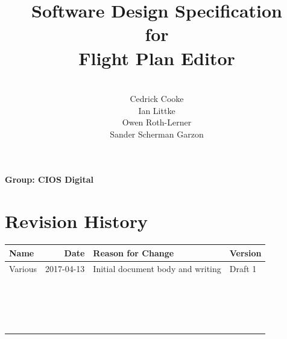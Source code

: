 \documentclass[12pt, letterpaper]{article}
\title{Software Design Specification\\for\\Flight Plan Editor}
\date{}
\author{
\\Cedrick Cooke\\
Ian Littke\\
Owen Roth-Lerner\\
Sander Scherman Garzon
}
\makeatletter
\renewcommand{\maketitle}{\bgroup\setlength{\parindent}{0pt}
\thispagestyle{empty}
\null
  \begin{flushleft}
  \vspace{15mm}
  \vskip2mm
  \Huge{\textbf{\@title}}
  \vspace{8cm}

  \textbf{Group: CIOS Digital}
  \@author
  \end{flushleft}\egroup
}
\makeatother
\begin{document}
\maketitle
\newpage
\section*{Revision History}
\begin{tabularx}{\textwidth}{|l|r|X|l|}
\hline
\textbf{Name} & \textbf{Date} & \textbf{Reason for Change} & \textbf{Version} \\ \hline
Various & 2017-04-13 & Initial document body and writing & Draft 1 \\ \hline
        &            &                                   &         \\ \hline
        &            &                                   &         \\ \hline
        &            &                                   &         \\ \hline
        &            &                                   &         \\ \hline
        &            &                                   &         \\ \hline
        &            &                                   &         \\ \hline
        &            &                                   &         \\ \hline
        &            &                                   &         \\ \hline
        &            &                                   &         \\ \hline
        &            &                                   &         \\ \hline
        &            &                                   &         \\ \hline
        &            &                                   &         \\ \hline
        &            &                                   &         \\ \hline
        &            &                                   &         \\ \hline
        &            &                                   &         \\ \hline
        &            &                                   &         \\ \hline
        &            &                                   &         \\ \hline
        &            &                                   &         \\ \hline
\end{tabularx}
\newpage
\tableofcontents
\end{document}
